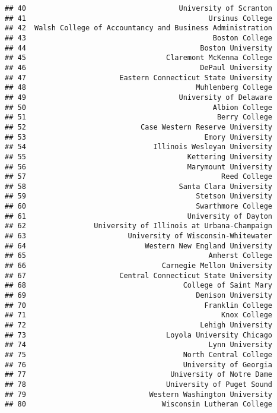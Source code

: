 \documentclass[
]{article}
\begin{document}
\begin{verbatim}
## 40                                    University of Scranton
## 41                                           Ursinus College
## 42  Walsh College of Accountancy and Business Administration
## 43                                            Boston College
## 44                                         Boston University
## 45                                 Claremont McKenna College
## 46                                         DePaul University
## 47                      Eastern Connecticut State University
## 48                                        Muhlenberg College
## 49                                    University of Delaware
## 50                                            Albion College
## 51                                             Berry College
## 52                           Case Western Reserve University
## 53                                          Emory University
## 54                              Illinois Wesleyan University
## 55                                      Kettering University
## 56                                      Marymount University
## 57                                              Reed College
## 58                                    Santa Clara University
## 59                                        Stetson University
## 60                                        Swarthmore College
## 61                                      University of Dayton
## 62                University of Illinois at Urbana-Champaign
## 63                        University of Wisconsin-Whitewater
## 64                            Western New England University
## 65                                           Amherst College
## 66                                Carnegie Mellon University
## 67                      Central Connecticut State University
## 68                                     College of Saint Mary
## 69                                        Denison University
## 70                                          Franklin College
## 71                                              Knox College
## 72                                         Lehigh University
## 73                                 Loyola University Chicago
## 74                                           Lynn University
## 75                                     North Central College
## 76                                     University of Georgia
## 77                                  University of Notre Dame
## 78                                 University of Puget Sound
## 79                             Western Washington University
## 80                                Wisconsin Lutheran College

\end{verbatim}
\end{document}
